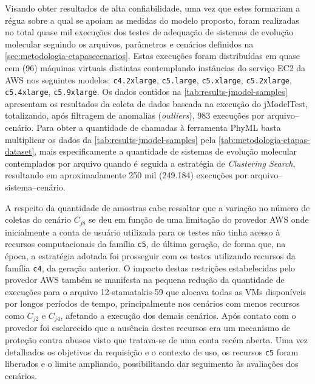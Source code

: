 \documentclass[english,brazilian]{UNISINOSmonografia} %
\begin{document}
Visando obter resultados de alta confiabilidade, uma vez que estes formariam a régua sobre a qual se apoiam as medidas do modelo proposto, foram realizadas no total quase mil execuções dos testes de adequação de sistemas de evolução molecular seguindo os arquivos, parâmetros e cenários definidos na \autoref{sec:metodologia-etapasecenarios}.
%
Estas execuções foram distribuídas em quase cem (96) máquinas virtuais distintas contemplando instâncias do serviço EC2 da AWS nos seguintes modelos: \texttt{c4.2xlarge}, \texttt{c5.large}, \texttt{c5.xlarge}, \texttt{c5.2xlarge}, \texttt{c5.4xlarge}, \texttt{c5.9xlarge}.
%
Os dados contidos na \autoref{tab:results-jmodel-samples} apresentam os resultados da coleta de dados baseada na execução do jModelTest, totalizando, após filtragem de anomalias (\textit{outliers}), 983 execuções por arquivo--cenário.
%
Para obter a quantidade de chamadas à ferramenta PhyML basta multiplicar os dados da \autoref{tab:results-jmodel-samples} pela \autoref{tab:metodologia-etapas-dataset}, mais especificamente a quantidade de sistemas de evolução molecular contemplados por arquivo quando é seguida a estratégia de \textit{Clustering Search}, resultando em aproximadamente 250 mil (249.184) execuções por arquivo--sistema--cenário.


A respeito da quantidade de amostras cabe ressaltar que a variação no número de coletas do cenário $C_{j8}$ se deu em função de uma limitação do provedor AWS onde inicialmente a conta de usuário utilizada para os testes não tinha acesso à recursos computacionais da família \texttt{c5}, de última geração, de forma que, na época, a estratégia adotada foi prosseguir com os testes utilizando recursos da família \texttt{c4}, da geração anterior.
%
O impacto destas restrições estabelecidas pelo provedor AWS também se manifesta na pequena redução da quantidade de execuções para o arquivo 12-stamatakis-59 que alocava todas as VMs disponíveis por longos períodos de tempo, principalmente nos cenários com menos recursos como $C_{j2}$ e $C_{j4}$, afetando a execução dos demais cenários.
%
Após contato com o provedor foi esclarecido que a ausência destes recursos era um mecanismo de proteção contra abusos visto que tratava-se de uma conta recém aberta.
%
Uma vez detalhados os objetivos da requisição e o contexto de uso, os recursos \texttt{c5} foram liberados e o limite ampliando, possibilitando dar seguimento às avaliações dos cenários.
\end{document}

